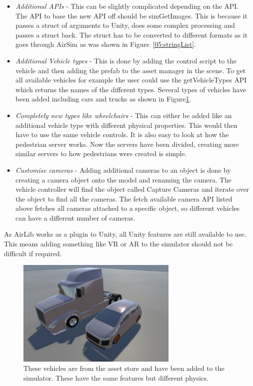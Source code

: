 \begin{itemize}
\item \emph{Additional APIs} - This can be slightly complicated depending on the API. The API to base the new API off should be simGetImages. This is because it passes a struct of arguments to Unity, does some complex processing and passes a struct back. The struct has to be converted to different formats as it goes through AirSim as was shown in Figure~\ref{05:stringList}.
\item \emph{Additional Vehicle types} - This is done by adding the control script to the vehicle and then adding the prefab to the asset manager in the scene. To get all available vehicles for example the user could use the getVehicleTypes API which returns the names of the different types. Several types of vehicles have been added including cars and trucks as shown in Figure\ref{06:otherTypes}.
\item \emph{Completely new types like wheelchairs} - This can either be added like an additional vehicle type with different physical properties. This would then have to use the same vehicle controls. It is also easy to look at how the pedestrian server works. Now the servers have been divided, creating more similar servers to how pedestrians were created is simple.  
\item \emph{Customise cameras} - Adding additional cameras to an object is done by creating a camera object onto the model and renaming the camera. The vehicle controller will find the object called Capture Cameras and iterate over the object to find all the cameras. The fetch available camera API listed above fetches all cameras attached to a specific object, so different vehicles can have a different number of cameras. 
\end{itemize}

As AirLib works as a plugin to Unity, all Unity features are still available to use. This means adding something like VR or AR to the simulator should not be difficult if required.  

\begin{figure}[h]
    \centering
    \includegraphics[width=0.7\textwidth]{06_Implementation/00_AirSim/Diagrams/AdditionalVehicles.JPG}
    \caption[Additional Vehicles]{These vehicles are from the asset store and have been added to the simulator. These have the same features but different physics.} \label{06:otherTypes}
\end{figure}



